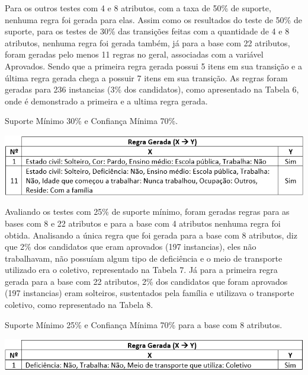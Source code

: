 \par
Para os outros testes com 4 e 8 atributos, com a taxa de 50\% de suporte, nenhuma regra foi gerada para elas. Assim como os resultados do teste de 50\% de suporte, para os testes de 30\% das transições feitas com a quantidade de 4 e 8 atributos, nenhuma regra foi gerada também, já para a base com 22 atributos, foram geradas pelo menos 11 regras no geral, associadas com a variável Aprovados. Sendo que a primeira regra gerada possui 5 itens em sua transição e a última regra gerada chega a possuir 7 itens em sua transição. As regras foram geradas para 236 instancias (3\% dos candidatos), como apresentado na Tabela 6, onde é demonstrado a primeira e a ultima regra gerada.

\par
\begin{table}[!htp]
	\begin{center}
    \caption{\label{fig:waveform_fig} Suporte Mínimo 30\% e Confiança Mínima 70\%.}
	\includegraphics[scale=0.75]{Figuras/Suporte_30_atributos_22.png}
	\end{center}
\end{table}


\par
Avaliando os testes com 25\% de suporte mínimo, foram geradas regras para as bases com 8 e 22 atributos e para a base com 4 atributos nenhuma regra foi obtida. Analisando a única regra que foi gerada para a base com 8 atributos, diz que 2\% dos candidatos que eram aprovados (197 instancias), eles não trabalhavam, não possuíam algum tipo de deficiência e o meio de transporte utilizado era o coletivo, representado na Tabela 7. Já para a primeira regra gerada para a base com 22 atributos, 2\% dos candidatos que foram aprovados (197 instancias) eram solteiros, sustentados pela família e utilizava o transporte coletivo, como representado na Tabela 8.

\par
\begin{table}[!htp]
	\begin{center}
    \caption{\label{fig:waveform_fig} Suporte Mínimo 25\% e Confiança Mínima 70\% para a base com 8 atributos.}
	\includegraphics[scale=0.75]{Figuras/Suporte_25_atributos_9.png}
	\end{center}
\end{table}


